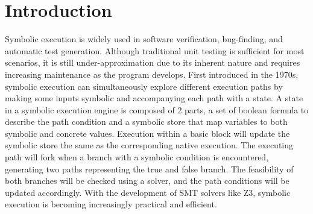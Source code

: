 \documentclass[sigplan, nonacm]{acmart}\settopmatter{printfolios=true,printccs=false,printacmref=false}
\begin{document}
\section{Introduction}
Symbolic execution is widely used in software verification, bug-finding, and automatic test generation. Although traditional unit testing is sufficient for most scenarios, it is still under-approximation due to its inherent nature and requires increasing maintenance as the program develops. First introduced in the 1970s\cite{boyer1975select, howden1977symbolic, king1975new, king1976symbolic}, symbolic execution can simultaneously explore different execution paths by making some inputs symbolic and accompanying each path with a state. A state in a symbolic execution engine is composed of 2 parts, a set of boolean formula to describe the path condition and a symbolic store that map variables to both symbolic and concrete values. Execution within a basic block will update the symbolic store the same as the corresponding native execution. The executing path will fork when a branch with a symbolic condition is encountered, generating two paths representing the true and false branch. The feasibility of both branches will be checked using a solver, and the path conditions will be updated accordingly. With the development of SMT\cite{barrett2021satisfiability} solvers like Z3\cite{moura2008z3}, symbolic execution is becoming increasingly practical and efficient.\par
\end{document}

